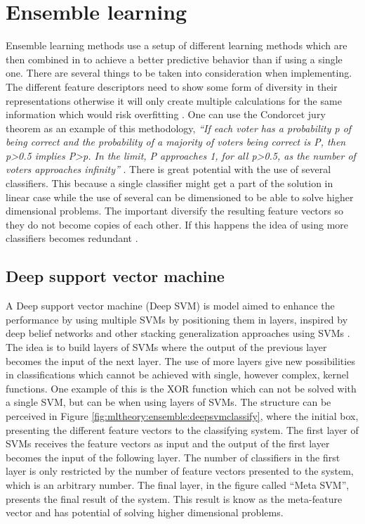 
\section{Ensemble learning}

Ensemble learning methods use a setup of different learning methods which are then combined in to achieve a better predictive behavior than if using a single one. There are several things to be taken into consideration when implementing. The different feature descriptors need to show some form of diversity in their representations otherwise it will only create multiple calculations for the same information which would risk overfitting \cite{cunningham2000diversity}\cite{krogh1995neural}. One can use the Condorcet jury theorem as an example of this methodology, \textit{``If each voter has a probability p of being correct and the probability of a majority of voters being correct is P, then p>0.5 implies P>p. In the limit, P approaches 1, for all p>0.5, as the number of voters approaches infinity''} \cite{cord2008machine}\cite{grofman1983thirteen}.
There is great potential with the use of several classifiers. This because a single classifier  might get a part of the solution in linear case while the use of several can be dimensioned to be able to solve higher dimensional problems. The important diversify the resulting feature vectors so they do not become copies of each other. If this happens the idea of using more classifiers becomes redundant \cite{kim2003ensembleSVM}. 


\subsection{Deep support vector machine}
\label{sec:deepSVM}
A Deep support vector machine (Deep SVM) is model aimed to enhance the performance by using multiple SVMs by positioning them in layers, inspired by deep belief networks \cite{hinton2006reducing} and other stacking generalization approaches using SVMs \cite{chen2009using}.
The idea is to build layers of SVMs where the output of the previous layer becomes the input of the next layer. The use of more layers give new possibilities in classifications which cannot be achieved with single, however complex, kernel functions. One example of this is the XOR function which can not be solved with a single SVM, but can be when using layers of SVMs. The structure can be perceived in Figure \ref{fig:mltheory:ensemble:deepsvmclassify}, where the initial box, presenting the different feature vectors to the classifying system. The first layer of SVMs receives the feature vectors as input and the output of the first layer becomes the input of the following layer. The number of classifiers in the first layer is only restricted by the number of feature vectors presented to the system, which is an arbitrary number. The final layer, in the figure called ``Meta SVM'', presents the final result of the system. This result is know as the meta-feature vector and has potential of solving higher dimensional problems.

